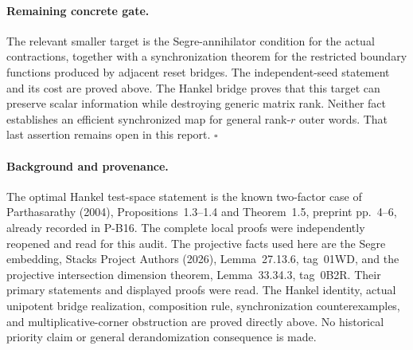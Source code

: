 \paragraph{Remaining concrete gate.}
The relevant smaller target is the Segre-annihilator condition for
the actual contractions, together with a synchronization theorem
for the restricted boundary functions produced by adjacent reset
bridges. The independent-seed statement and its cost are proved
above. The Hankel bridge proves that this target can preserve scalar
information while destroying generic matrix rank. Neither fact
establishes an efficient synchronized map for general rank-$r$
outer words. That last assertion remains open in this report.
\hfill$\square$

\paragraph{Background and provenance.}
The optimal Hankel test-space statement is the known two-factor
case of Parthasarathy (2004), Propositions~1.3--1.4 and Theorem~1.5,
preprint pp.~4--6, already recorded in P-B16. The complete local
proofs were independently reopened and read for this audit.
The projective facts used here are the Segre embedding, Stacks
Project Authors (2026), Lemma~27.13.6, tag~01WD, and the projective
intersection dimension theorem, Lemma~33.34.3, tag~0B2R. Their
primary statements and displayed proofs were read. The Hankel
identity, actual unipotent bridge realization, composition rule,
synchronization counterexamples, and multiplicative-corner
obstruction are proved directly above. No historical priority
claim or general derandomization consequence is made.
